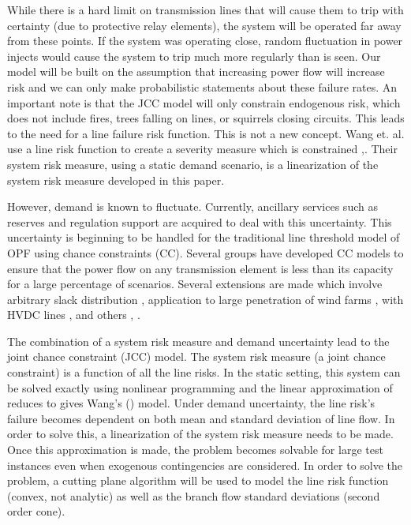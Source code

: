 While there is a hard limit on transmission lines that will cause them to trip with certainty (due to protective relay elements), the system will be operated far away from these points.  If the system was operating close, random fluctuation in power injects would cause the system to trip much more regularly than is seen.  Our model will be built on the assumption that increasing power flow will increase risk and we can only make probabilistic statements about these failure rates. An important note is that the JCC model will only constrain endogenous risk, which does not include fires, trees falling on lines, or squirrels closing circuits.  This leads to the need for a line failure risk function.  This is not a new concept.  Wang et. al. use a line risk function to create a severity measure which is constrained \cite{wang_2013},\cite{wang_2014}.  Their system risk measure, using a static demand scenario, is a linearization of the system risk measure developed in this paper. 

However, demand is known to fluctuate.  Currently, ancillary services such as reserves and regulation support are acquired to deal with this uncertainty.  This uncertainty is beginning to be handled for the traditional line threshold model of OPF using chance constraints (CC).  Several groups have developed CC models to ensure that the power flow on any transmission element is less than its capacity for a large percentage of scenarios.  Several extensions are made which involve arbitrary slack distribution \cite{bienstock_2012}, application to large penetration of wind farms \cite{vrakopoulou_2013b}, with HVDC lines \cite{vrakopoulou_2013}, and others \cite{roald_2013}, \cite{vrakopoulou_2013c}.

The combination of a system risk measure and demand uncertainty lead to the joint chance constraint (JCC) model.  The system risk measure (a joint chance constraint) is a function of all the line risks.  In the static setting, this  system can be solved exactly using nonlinear programming and the linear approximation of reduces to gives Wang's (\cite{wang_2013}) model.  Under demand uncertainty, the line risk's failure becomes dependent on both mean and standard deviation of line flow. In order to solve this, a linearization of the system risk measure needs to be made.  Once this approximation is made, the problem becomes solvable for large test instances even when exogenous contingencies are considered.  In order to solve the problem, a cutting plane algorithm will be used to model the line risk function (convex, not analytic) as well as the branch flow standard deviations (second order cone).

